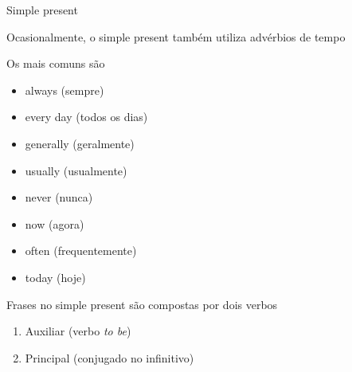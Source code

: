 \documentclass[compress,mathserif,xcolor=table]{beamer}
\begin{document}
\begin{frame}{Simple present}

Ocasionalmente, o simple present também utiliza advérbios de tempo

Os mais comuns são

\begin{minipage}{.49\textwidth}
\begin{itemize}
    \item always (sempre)
    \item every day (todos os dias)
    \item generally (geralmente)
    \item usually (usualmente)
\end{itemize}
\end{minipage}
\begin{minipage}{.49\textwidth}
\begin{itemize}
    \item never (nunca) 
    \item now (agora)
    \item often (frequentemente)
    \item today (hoje)
\end{itemize}
\end{minipage}

\vspace{0.5cm}

Frases no simple present são compostas por dois verbos
\begin{enumerate}
    \item Auxiliar (verbo \textit{to be})
    \item Principal (conjugado no infinitivo)
\end{enumerate}

\end{frame}

\end{document}
